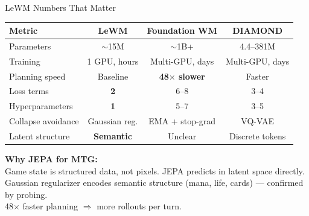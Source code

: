 \documentclass[aspectratio=169, 10pt]{beamer}
\begin{document}
\begin{frame}{LeWM Numbers That Matter}
  \begin{center}
  \begin{tabular}{@{}lccc@{}}
    \toprule
    \textbf{Metric} & \textbf{LeWM} & \textbf{Foundation WM} & \textbf{DIAMOND} \\
    \midrule
    Parameters       & $\sim$15M     & $\sim$1B+              & 4.4--381M \\
    Training         & 1 GPU, hours  & Multi-GPU, days        & Multi-GPU, days \\
    Planning speed   & Baseline      & \textbf{48$\times$ slower}  & Faster \\
    Loss terms       & \textbf{2}    & 6--8                   & 3--4 \\
    Hyperparameters  & \textbf{1}    & 5--7                   & 3--5 \\
    Collapse avoidance & Gaussian reg. & EMA + stop-grad     & VQ-VAE \\
    Latent structure & \textbf{Semantic} & Unclear            & Discrete tokens \\
    \bottomrule
  \end{tabular}
  \end{center}
  \vspace{0.3cm}
  \begin{center}
  \footnotesize
  \textbf{Why JEPA for MTG:}\\
  Game state is structured data, not pixels.  JEPA predicts in latent space directly.\\
  Gaussian regularizer encodes semantic structure (mana, life, cards) --- confirmed by probing.\\
  48$\times$ faster planning $\Rightarrow$ more rollouts per turn.
  \end{center}
\end{frame}
\end{document}
